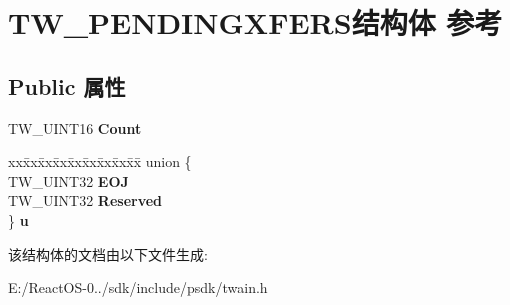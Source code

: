 \hypertarget{struct_t_w___p_e_n_d_i_n_g_x_f_e_r_s}{}\section{T\+W\+\_\+\+P\+E\+N\+D\+I\+N\+G\+X\+F\+E\+R\+S结构体 参考}
\label{struct_t_w___p_e_n_d_i_n_g_x_f_e_r_s}
\subsection*{Public 属性}
\begin{DoxyCompactItemize}
\item 
\mbox{\label{struct_t_w___p_e_n_d_i_n_g_x_f_e_r_s_ac93067e0794a8345133a3a7dbc57cfa5}} 
T\+W\+\_\+\+U\+I\+N\+T16 {\bfseries Count}
\item 
\mbox{\label{struct_t_w___p_e_n_d_i_n_g_x_f_e_r_s_a2a6344edc4e400c7701427017f80dc49}} 
\begin{tabbing}
xx\=xx\=xx\=xx\=xx\=xx\=xx\=xx\=xx\=\kill
union \{\\
\>TW\_UINT32 {\bfseries EOJ}\\
\>TW\_UINT32 {\bfseries Reserved}\\
\} {\bfseries u}\\

\end{tabbing}\end{DoxyCompactItemize}


该结构体的文档由以下文件生成\+:\begin{DoxyCompactItemize}
\item 
E\+:/\+React\+O\+S-\/0../sdk/include/psdk/twain.\+h\end{DoxyCompactItemize}
